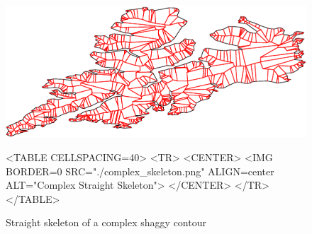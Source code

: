 \begin{figure}[htbp]
\begin{ccTexOnly}
\begin{center}
\includegraphics{Straight_skeleton_2/complex_skeleton} %
\end{center}
\end{ccTexOnly}

\begin{ccHtmlOnly}
<TABLE CELLSPACING=40>
<TR>
<CENTER>
<IMG BORDER=0 SRC="./complex_skeleton.png" ALIGN=center ALT="Complex Straight Skeleton">
</CENTER>
</TR>
</TABLE>
\end{ccHtmlOnly}

\caption{Straight skeleton of a complex shaggy contour
\label{ComplexSLS}}
\end{figure}

